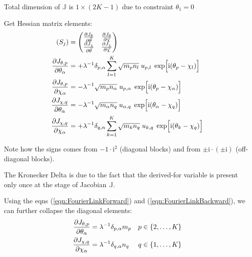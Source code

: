 \documentclass[
	english,
	a4paper,
	fontsize=10pt,
	parskip=half,
	titlepage=true,
	DIV=12,
	final
]{scrreprt}
\newcommand*{\iunit}{\ensuremath{\mathrm{i}}}
\begin{document}
Total dimension of $\mathbb{J}$ is $1 \times (2K - 1)$ due to constraint $\theta_1 = 0$

Get Hessian matrix elements:
\begin{align}
	\qty( S_j )
&=
	\begin{pmatrix}
		\pdv{J_{\theta}}{\vec{\theta}} &
		\pdv{J_{\theta}}{\vec{\chi  }} 
		\\
		\pdv{J_{\chi  }}{\vec{\theta}} &
		\pdv{J_{\chi  }}{\vec{\chi  }} 
	\end{pmatrix}
\\
	\pdv{J_{\theta, p}}{\theta_{\alpha}}
&=
	+
	\lambda^{-1}
	\delta_{p,\alpha}
	\sum_{l=1}^{K}
		\sqrt{m_p n_l} \; u_{p,l} \; \exp[\Big. \iunit(\theta_p - \chi_l)]
\\
	\pdv{J_{\theta, p}}{\chi_{\alpha}}
&=
	-
	\lambda^{-1}
	\sqrt{m_p n_\alpha} \; u_{p,\alpha} \; \exp[\Big. \iunit(\theta_p - \chi_\alpha)]
\\
	\pdv{J_{\chi, q}}{\theta_{\alpha}}
&=
	-
	\lambda^{-1}
	\sqrt{m_\alpha n_q} \; u_{\alpha,q} \; \exp[\Big. \iunit(\theta_\alpha - \chi_q)]
\\
	\pdv{J_{\chi, q}}{\chi_{\alpha}}
&=
	+
	\lambda^{-1}
	\delta_{q,\alpha}
	\sum_{k=1}^{K}
		\sqrt{m_k n_q} \; u_{k,q} \; \exp[\Big. \iunit(\theta_k - \chi_q)]
\end{align}

Note how the signs comes from $-1 \cdot \iunit^{2}$ (diagonal blocks) and from 
$\pm\iunit \cdot (\pm\iunit)$ (off-diagonal blocks).

The Kronecker Delta is due to the fact that the derived-for variable is present only once at the stage of Jacobian $\mathbb{J}$.

Using the eqns (\ref{eqn:FourierLinkForward}) and (\ref{eqn:FourierLinkBackward}), we can further collapse the diagonal elements:
\begin{align}
	\pdv{J_{\theta, p}}{\theta_{\alpha}}
&=
	\lambda^{-1}
	\delta_{p,\alpha}
	m_p
&
	p \in \{2, \ldots, K\}
\\
	\pdv{J_{\chi, q}}{\chi_{\alpha}}
&=
	\lambda^{-1}
	\delta_{q,\alpha}
	n_q
&
	q \in \{1, \ldots, K\}
\end{align}
\end{document}
